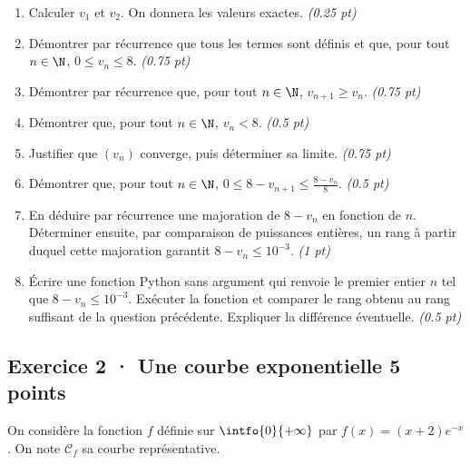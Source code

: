 \begin{enumerate}

\item Calculer $v_1$ et $v_2$. On donnera les valeurs exactes. \hfill\textit{(\num{0,25} pt)}

\item Démontrer par récurrence que tous les termes sont définis et que, pour tout $n\in\N$, $0\le v_n\le8$. \hfill\textit{(\num{0,75} pt)}

\item Démontrer par récurrence que, pour tout $n\in\N$, $v_{n+1}\ge v_n$. \hfill\textit{(\num{0,75} pt)}

\item Démontrer que, pour tout $n\in\N$, $v_n<8$. \hfill\textit{(\num{0,5} pt)}

\item Justifier que $(v_n)$ converge, puis déterminer sa limite. \hfill\textit{(\num{0,75} pt)}

\item Démontrer que, pour tout $n\in\N$, $0\le 8-v_{n+1}\le\frac{8-v_n}{8}$. \hfill\textit{(\num{0,5} pt)}

\item En déduire par récurrence une majoration de $8-v_n$ en fonction de $n$. Déterminer ensuite, par comparaison de puissances entières, un rang à partir duquel cette majoration garantit $8-v_n\le10^{-3}$. \hfill\textit{(1 pt)}

\item Écrire une fonction Python sans argument qui renvoie le premier entier $n$ tel que $8-v_n\le10^{-3}$. Exécuter la fonction et comparer le rang obtenu au rang suffisant de la question précédente. Expliquer la différence éventuelle. \hfill\textit{(\num{0,5} pt)}

\end{enumerate}

\subsection*{Exercice 2 · Une courbe exponentielle \hfill 5 points}On considère la fonction $f$ définie sur $\intfo{0}{+\infty}$ par $f(x)=(x+2)e^{-x}$. On note $\mathcal C_f$ sa courbe représentative.

